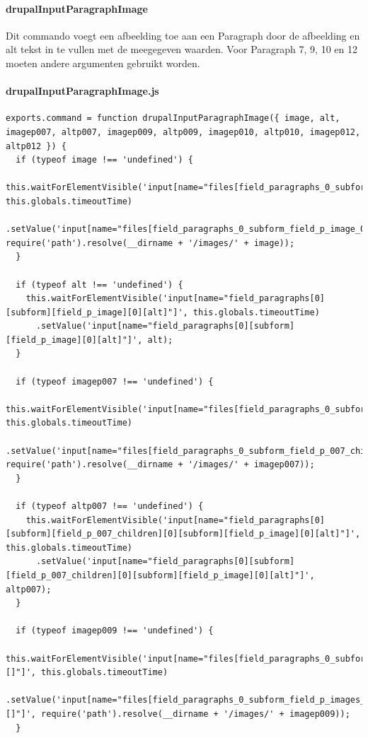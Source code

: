 \clearpage
\paragraph{drupalInputParagraphImage}
\label{commando20}
Dit commando voegt een afbeelding toe aan een Paragraph door de afbeelding en alt tekst in te vullen met de meegegeven waarden. Voor Paragraph 7, 9, 10 en 12 moeten andere argumenten gebruikt worden.
\paragraph{drupalInputParagraphImage.js}
\begin{lstlisting}[breaklines=true]
exports.command = function drupalInputParagraphImage({ image, alt, imagep007, altp007, imagep009, altp009, imagep010, altp010, imagep012, altp012 }) {
  if (typeof image !== 'undefined') {
    this.waitForElementVisible('input[name="files[field_paragraphs_0_subform_field_p_image_0]"]', this.globals.timeoutTime)
      .setValue('input[name="files[field_paragraphs_0_subform_field_p_image_0]"]', require('path').resolve(__dirname + '/images/' + image));
  }

  if (typeof alt !== 'undefined') {
    this.waitForElementVisible('input[name="field_paragraphs[0][subform][field_p_image][0][alt]"]', this.globals.timeoutTime)
      .setValue('input[name="field_paragraphs[0][subform][field_p_image][0][alt]"]', alt);
  }

  if (typeof imagep007 !== 'undefined') {
    this.waitForElementVisible('input[name="files[field_paragraphs_0_subform_field_p_007_children_0_subform_field_p_image_0]"]', this.globals.timeoutTime)
      .setValue('input[name="files[field_paragraphs_0_subform_field_p_007_children_0_subform_field_p_image_0]"]', require('path').resolve(__dirname + '/images/' + imagep007));
  }

  if (typeof altp007 !== 'undefined') {
    this.waitForElementVisible('input[name="field_paragraphs[0][subform][field_p_007_children][0][subform][field_p_image][0][alt]"]', this.globals.timeoutTime)
      .setValue('input[name="field_paragraphs[0][subform][field_p_007_children][0][subform][field_p_image][0][alt]"]', altp007);
  }

  if (typeof imagep009 !== 'undefined') {
    this.waitForElementVisible('input[name="files[field_paragraphs_0_subform_field_p_images_unlimited_0][]"]', this.globals.timeoutTime)
      .setValue('input[name="files[field_paragraphs_0_subform_field_p_images_unlimited_0][]"]', require('path').resolve(__dirname + '/images/' + imagep009));
  }


\end{lstlisting}
